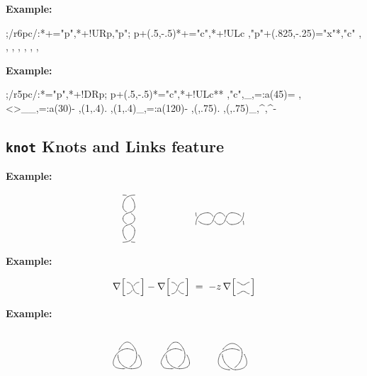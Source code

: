 \documentclass{article}
\newenvironment{code}{\par\noindent\textbf{Example:}\par\noindent}{}
\begin{document}
\begin{code}
;/r6pc/:*+\dir{*}="p",*+!UR{p},"p";
p+(.5,-.5)*+\dir{*}="c",*+!UL{c}
,"p"+(.825,-.25)="x"*\dir{+},"c"
,{}
,{}
,{}
,{}
,{}
,{}
,{}
\endxy
\end{code}
\begin{code}
;/r5pc/:*\dir{*}="p",*+!DR{p};
p+(.5,-.5)*\dir{*}="c",*+!UL{c}**\dir{-}
,"c",{\ellipse<15pt>_,=:a(45){=}}
  ,{\ellipse<>__,=:a(30){-}}
,{\ellipse(1,.4){.}}
  ,{\ellipse(1,.4)_,=:a(120){-}}
,{\ellipse(,.75){.}}
  ,{\ellipse(,.75)_,^,^{-}}\endxy
\end{code}

\subsection{\texttt{knot} Knots and Links feature}

\begin{code}
$$\xy 0;/r1pc/:
 ,{\vunder\vtwist\vtwist\vunder-}\endxy
\qquad\qquad\qquad \xy 0;/r1pc/:+(0,-1.5)
 ,{\hover\hcross\hcross\hover-}\endxy$$
\end{code}
\begin{code}
\UseComputerModernTips {}
\def\Conway#1{\mathord{\nabla\Bigl[\,
 \raise5pt\xybox{0;/r1pc/:#1}\,\Bigr]}}
$$
\Conway\htwist - \Conway\htwistneg
 \;=\; -z\,\Conway\huntwist $$
\end{code}
\begin{code}
\def\TrefoilA{\xygraph{!{0;/r.75pc/:}
 !P3"a"{~>{}}!P9"b"{~:{(1.3288,0):}~>{}}
 !P3"c"{~:{(2.5,0):}~>{}}
 !{\vover~{"b2"}{"b1"}{"a1"}{"a3"}}
 !{"b4";"b2"**\crv{"c1"}}
 !{\vover~{"b5"}{"b4"}{"a2"}{"a1"}}
 !{"b7";"b5"**\crv{"c2"}}
 !{\vover~{"b8"}{"b7"}{"a3"}{"a2"}}
 !{"b1";"b8"**\crv{"c3"}}}}
%
\def\TrefoilB{\xygraph{!{0;/r.75pc/:}
 !P3"a"{~>{}}!P9"b"{~:{(1.3288,0):}~>{}}
 !P3"c"{~:{(2.5,0):}~>{}}
 !{\vover~{"b2"}{"b1"}{"a1"}{"a3"}}
 !{\vcap~{"c1"}{"c1"}{"b4"}{"b2"}@(+.1)}
 !{\vover~{"b5"}{"b4"}{"a2"}{"a1"}}
 !{\vcap~{"c2"}{"c2"}{"b7"}{"b5"}@(+.2)}
 !{\vover~{"b8"}{"b7"}{"a3"}{"a2"}}
 !{\vcap~{"c3"}{"c3"}{"b1"}{"b8"}}}}
%
\def\TrefoilC{\xygraph{!{0;/r.75pc/:}
 !P3"a"{~>{}}
 !P12"b"{~:{(1.414,0):}~>{}}
 !{\vover~{"b2"}{"b1"}{"a1"}{"a3"}}
 !{\save 0;"b2"-"b5":"b5",
   \xcaph @(+.1)\restore}
 !{\vover~{"b6"}{"b5"}{"a2"}{"a1"}}
 !{\save 0;"b6"-"b9":"b9",
   \xcaph @(+.2)\restore}
 !{\vover~{"b10"}{"b9"}{"a3"}{"a2"}}
 !{\save 0;"b10"-"b1":"b1",
    \xcaph @(+.3)\restore} }}
$$\TrefoilA\quad\TrefoilB
   \quad\TrefoilC$$
\end{code}
\end{document}
